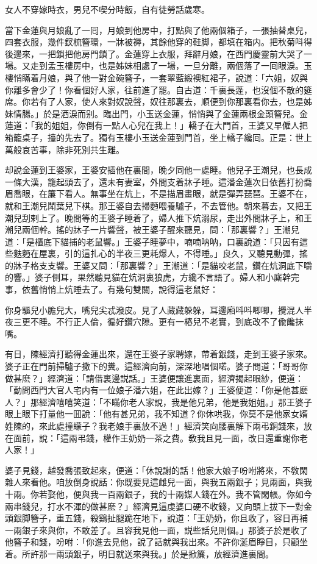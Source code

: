 女人不穿嫁時衣，男兒不喫分時飯，自有徒勞話歲寒。

當下金蓮與月娘亂了一囘，月娘到他房中，打點與了他兩個箱子，一張抽替桌兒，四套衣服，幾件釵梳簪環，一牀被褥，其餘他穿的鞋脚，都填在箱内。把秋菊呌得後邊來，一把鎖把他房門鎖了。金蓮穿上衣服，拜辭月娘，在西門慶靈前大哭了一場。又走到孟玉樓房中，也是姊妹相處了一場，一旦分離，兩個落了一囘眼淚。玉樓悄瞞着月娘，與了他一對金碗簪子，一套翠藍緞襖紅裙子，說道：「六姐，奴與你離多會少了！你看個好人家，往前進了罷。自古道：千裏長蓬，也沒個不散的筵席。你若有了人家，使人來對奴說聲，奴往那裏去，順便到你那裏看你去，也是姊妹情腸。」於是洒淚而别。臨出門，小玉送金蓮，悄悄與了金蓮兩根金頭簪兒。金蓮道：「我的姐姐，你倒有一點人心兒在我上！」轎子在大門首，王婆又早僱人把箱籠桌子，擡的先去了。獨有玉樓小玉送金蓮到門首，坐上轎子纔囘。正是：世上萬般哀苦事，除非死別共生離。

却說金蓮到王婆家，王婆安插他在裏間，晚夕同他一處睡。他兒子王潮兒，也長成一條大漢，籠起頭去了，還未有妻室，外間支着牀子睡。這潘金蓮次日依舊打扮喬眉喬眼，在簾下看人。無事坐在炕上，不是描眉畫眼，就是彈弄琵琶。王婆不在，就和王潮兒鬦葉兒下棋。那王婆自去掃麪喂養驢子，不去管他。朝來暮去，又把王潮兒刮剌上了。晚間等的王婆子睡着了，婦人推下炕溺尿，走出外間牀子上，和王潮兒兩個幹。搖的牀子一片響聲，被王婆子醒來聽見，問：「那裏響？」王潮兒道：「是櫃底下貓捕的老鼠響。」王婆子睡夢中，喃喃呐呐，口裏說道：「只因有這些麩麪在屋裏，引的這扎心的半夜三更耗爆人，不得睡。」良久，又聽見動彈，搖的牀子格支支響。王婆又問：「那裏響？」王潮道：「是貓咬老鼠，鑽在炕洞底下嚼的響。」婆子側耳，果然聽見貓在炕洞裏狼虎，方纔不言語了。婦人和小廝幹完事，依舊悄悄上炕睡去了。有幾句雙關，說得這老鼠好：

你身驅兒小膽兒大，嘴兒尖忒潑皮。見了人藏藏躲躲，耳邊廂呌呌唧唧，攪混人半夜三更不睡。不行正人倫，徧好鑽穴隙。更有一樁兒不老實，到底改不了偸饞抹嘴。

有日，陳經濟打聽得金蓮出來，還在王婆子家聘嫁，帶着銀錢，走到王婆子家來。婆子正在門前掃驢子撒下的糞。這經濟向前，深深地唱個喏。婆子問道：「哥哥你做甚麽？」經濟道：「請借裏邊説話。」王婆便讓進裏面，經濟揭起眼紗，便道：「動問西門大官人宅内有一位娘子潘六姐，在此出嫁？」王婆便道：「你是他甚麽人？」那經濟嘻嘻笑道：「不瞞你老人家說，我是他兄弟，他是我姐姐。」那王婆子眼上眼下打量他一囬說：「他有甚兄弟，我不知道？你休哄我，你莫不是他家女婿姓陳的，來此處撞蠓子？我老娘手裏放不過！」經濟笑向腰裏解下兩弔銅錢來，放在面前，說：「這兩弔錢，權作王奶奶一茶之費。敎我且見一面，改日還重謝你老人家！」

婆子見錢，越發喬張致起來，便道：「休說謝的話！他家大娘子吩咐將來，不敎閑雜人來看他。咱放倒身說話：你既要見這雌兒一面，與我五兩銀子；見兩面，與我十兩。你若娶他，便與我一百兩銀子，我的十兩媒人錢在外。我不管閑帳。你如今兩串錢兒，打水不渾的做甚麽？」經濟見這虔婆口硬不收錢，又向頭上拔下一對金頭銀脚簪子，重五錢，殺鷄扯腿跪在地下，說道：「王奶奶，你且收了，容日再補一兩銀子來與你，不敢差了。且容我見他一面，説些話兒則個。」那婆子於是收了他簪子和錢，吩咐：「你進去見他，說了話就與我出來。不許你涎眉睜目，只顧坐着。所許那一兩頭銀子，明日就送來與我。」於是掀簾，放經濟進裏間。

